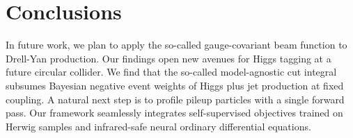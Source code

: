 \section{Conclusions}\label{sec:conclusions}

In future work, we plan to apply the so-called gauge-covariant beam
function to Drell-Yan production. Our findings open new avenues for
Higgs tagging at a future circular collider. We find that the so-called
model-agnostic cut integral subsumes Bayesian negative event weights of
Higgs plus jet production at fixed coupling. A natural next step is to
profile pileup particles with a single forward pass. Our framework
seamlessly integrates self-supervised objectives trained on Herwig
samples and infrared-safe neural ordinary differential equations.

